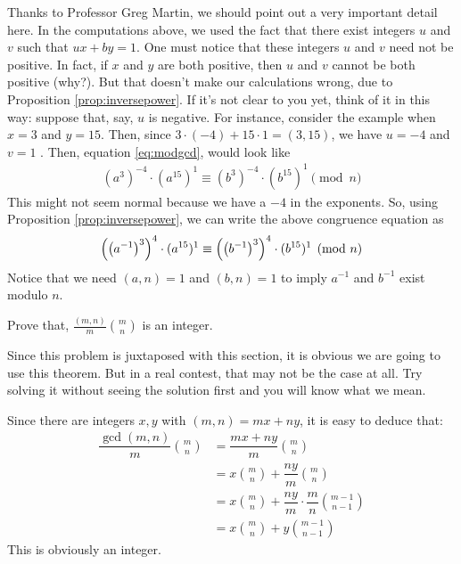 \begin{remark}
	Thanks to Professor Greg Martin, we should point out a very important detail here. In the computations above, we used the fact that there exist integers $u$ and $v$ such that $ux+by = 1$. One must notice that these integers $u$ and $v$ need not be positive. In fact, if $x$ and $y$ are both positive, then $u$ and $v$ cannot be both positive (why?). But that doesn't make our calculations wrong, due to Proposition \ref{prop:inversepower}. If it's not clear to you yet, think of it in this way: suppose that, say, $u$ is negative. For instance, consider the example when $x=3$ and $y=15$. Then, since $3 \cdot (-4) + 15 \cdot 1 = (3,15)$, we have $u=-4$ and $v=1$ . Then, equation \eqref{eq:modgcd}, would look like
		\begin{align*}
			(a^3)^{-4} \cdot (a^{15})^{1} \equiv (b^3)^{-4} \cdot (b^{15})^{1} \pmod n
		\end{align*}
	This might not seem normal because we have a $-4$ in the exponents. So, using Proposition \ref{prop:inversepower}, we can write the above congruence equation as
		\begin{align*}
			\left(\left(a^{-1}\right)^{3}\right)^{4} \cdot (a^{15})^{1} \equiv \left(\left(b^{-1}\right)^3\right)^{4} \cdot (b^{15})^{1} \pmod n
		\end{align*}
	Notice that we need $(a,n)=1$ and $(b,n)=1$ to imply $a^{-1}$ and $b^{-1}$ exist modulo $n$.
\end{remark}

\begin{problem}
	Prove that, $\frac{(m,n)}{m}\binom{m}{n}$ is an integer.
\end{problem}
Since this problem is juxtaposed with this section, it is obvious we are going to use this theorem. But in a real contest, that may  not be the case at all. Try solving it without seeing the solution first and you will know what we mean.
\begin{solution}
	Since there are integers $x,y$ with $(m,n)=mx+ny$, it is easy to deduce that:
		\begin{align*}
			\dfrac{\gcd(m,n)}{m}\binom{m}{n}
				& = \dfrac{mx+ny}{m}\binom{m}{n}\\
				& = x\binom{m}{n}+\dfrac{ny}{m}\binom{m}{n}\\
				& = x\binom{m}{n}+\dfrac{ny}{m}\cdot\dfrac{m}{n}\binom{m-1}{n-1}\\
				& = x\binom{m}{n}+y\binom{m-1}{n-1}
		\end{align*}
	This is obviously an integer.
\end{solution}

